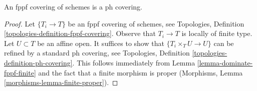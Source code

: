 \begin{lemma}
\label{lemma-fppf-ph}
An fppf covering of schemes is a ph covering.
\end{lemma}

\begin{proof}
Let $\{T_i \to T\}$ be an fppf covering of schemes, see
Topologies, Definition \ref{topologies-definition-fppf-covering}.
Observe that $T_i \to T$ is locally of finite type.
Let $U \subset T$ be an affine open.
It suffices to show that $\{T_i \times_T U \to U\}$
can be refined by a standard ph covering, see
Topologies, Definition \ref{topologies-definition-ph-covering}.
This follows immediately from Lemma \ref{lemma-dominate-fppf-finite}
and the fact that a finite morphism is proper
(Morphisms, Lemma \ref{morphisms-lemma-finite-proper}).
\end{proof}
